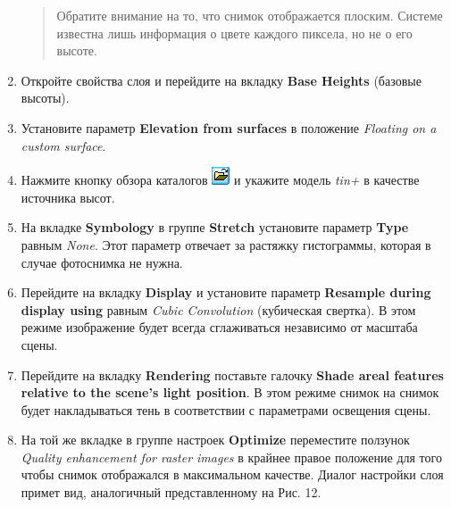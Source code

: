 \documentclass[]{book}
\theoremstyle{definition}
\theoremstyle{definition}
\theoremstyle{definition}
\theoremstyle{remark}
\begin{document}
\begin{enumerate}
  \begin{quote}
  Обратите внимание на то, что снимок отображается плоским. Системе
  известна лишь информация о цвете каждого пиксела, но не о его высоте.
  \end{quote}
\item
  Откройте свойства слоя и перейдите на вкладку \textbf{Base Heights}
  (базовые высоты).
\item
  Установите параметр \textbf{Elevation from surfaces} в положение
  \emph{Floating on a custom surface}.
\item
  Нажмите кнопку обзора каталогов
  \includegraphics{images/Ex18/image13.png} и укажите модель \emph{tin+}
  в качестве источника высот.
\item
  На вкладке \textbf{Symbology} в группе \textbf{Stretch} установите
  параметр \textbf{Type} равным \emph{None}. Этот параметр отвечает за
  растяжку гистограммы, которая в случае фотоснимка не нужна.
\item
  Перейдите на вкладку \textbf{Display} и установите параметр
  \textbf{Resample during display using} равным \emph{Cubic Convolution}
  (кубическая свертка). В этом режиме изображение будет всегда
  сглаживаться независимо от масштаба сцены.
\item
  Перейдите на вкладку \textbf{Rendering} поставьте галочку
  \textbf{Shade areal features relative to the scene's light position}.
  В этом режиме снимок на снимок будет накладываться тень в соответствии
  с параметрами освещения сцены.
\item
  На той же вкладке в группе настроек \textbf{Optimize} переместите
  ползунок \emph{Quality enhancement for raster images} в крайнее правое
  положение для того чтобы снимок отображался в максимальном качестве.
  Диалог настройки слоя примет вид, аналогичный представленному на Рис.
  12.


\end{enumerate}
\end{document}
